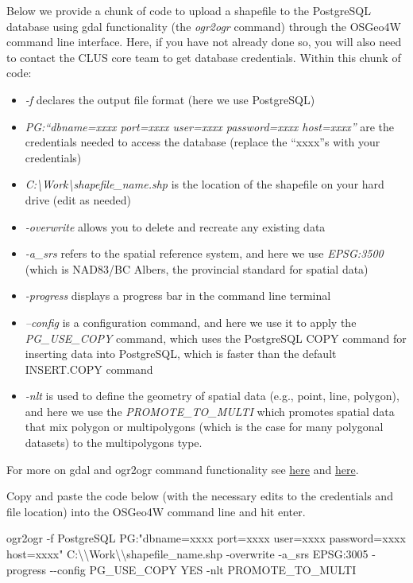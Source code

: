 \documentclass[
]{article}
\newenvironment{Shaded}{\begin{snugshade}}{\end{snugshade}}
\newcommand{\DecValTok}[1]{\textcolor[rgb]{0.00,0.00,0.81}{#1}}
\newcommand{\NormalTok}[1]{#1}
\newcommand{\SpecialCharTok}[1]{\textcolor[rgb]{0.00,0.00,0.00}{#1}}
\newcommand{\StringTok}[1]{\textcolor[rgb]{0.31,0.60,0.02}{#1}}
\providecommand{\tightlist}{%
  \setlength{\itemsep}{0pt}\setlength{\parskip}{0pt}}
\begin{document}
Below we provide a chunk of code to upload a shapefile to the PostgreSQL
database using gdal functionality (the \emph{ogr2ogr} command) through
the OSGeo4W command line interface. Here, if you have not already done
so, you will also need to contact the CLUS core team to get database
credentials. Within this chunk of code:

\begin{itemize}
\tightlist
\item
  \emph{-f} declares the output file format (here we use PostgreSQL)
\item
  \emph{PG:``dbname=xxxx port=xxxx user=xxxx password=xxxx host=xxxx''}
  are the credentials needed to access the database (replace the
  ``xxxx''s with your credentials)
\item
  \emph{C:\textbackslash Work\textbackslash shapefile\_name.shp} is the
  location of the shapefile on your hard drive (edit as needed)
\item
  \emph{-overwrite} allows you to delete and recreate any existing data
\item
  \emph{-a\_srs} refers to the spatial reference system, and here we use
  \emph{EPSG:3500} (which is NAD83/BC Albers, the provincial standard
  for spatial data)
\item
  \emph{-progress} displays a progress bar in the command line terminal
\item
  \emph{--config} is a configuration command, and here we use it to
  apply the \emph{PG\_USE\_COPY} command, which uses the PostgreSQL COPY
  command for inserting data into PostgreSQL, which is faster than the
  default INSERT.COPY command
\item
  \emph{-nlt} is used to define the geometry of spatial data (e.g.,
  point, line, polygon), and here we use the \emph{PROMOTE\_TO\_MULTI}
  which promotes spatial data that mix polygon or multipolygons (which
  is the case for many polygonal datasets) to the multipolygons type.
\end{itemize}

For more on gdal and ogr2ogr command functionality see
\href{https://gdal.org/programs/ogr2ogr.html}{here} and
\href{https://gdal.org/drivers/vector/pg.html}{here}.

Copy and paste the code below (with the necessary edits to the
credentials and file location) into the OSGeo4W command line and hit
enter.

\begin{Shaded}
\begin{Highlighting}[]
\NormalTok{ogr2ogr }\SpecialCharTok{{-}}\NormalTok{f PostgreSQL PG}\SpecialCharTok{:}\StringTok{"dbname=xxxx port=xxxx user=xxxx password=xxxx host=xxxx"}\NormalTok{ C}\SpecialCharTok{:}\NormalTok{\textbackslash{}\textbackslash{}Work\textbackslash{}\textbackslash{}shapefile\_name.shp }\SpecialCharTok{{-}}\NormalTok{overwrite }\SpecialCharTok{{-}}\NormalTok{a\_srs EPSG}\SpecialCharTok{:}\DecValTok{3005} \SpecialCharTok{{-}}\NormalTok{progress }\SpecialCharTok{{-}{-}}\NormalTok{config PG\_USE\_COPY YES }\SpecialCharTok{{-}}\NormalTok{nlt PROMOTE\_TO\_MULTI}
\end{Highlighting}
\end{Shaded}
\end{document}
